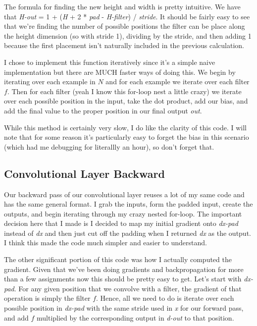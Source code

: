 \documentclass[12pt]{article}
\begin{document}
The formula for finding the new height and width is pretty intuitive. We have that 
\emph{H-out} = 1 + (\emph{H} + 2 * \emph{pad} - \emph{H-filter}) / \emph{stride}. It should 
be fairly easy to see that we're finding the number of possible positions the filter can
be place along the height dimension (so with stride 1), dividing by the stride, and then 
adding 1 because the first placement isn't naturally included in the previous calculation.

I chose to implement this function iteratively since it's a simple naive implementation but there are 
MUCH faster ways of doing this. We begin by iterating over each example in $N$ and for each 
example we iterate over each filter $f$. Then for each filter (yeah I know this for-loop nest 
a little crazy) we iterate over each possible position in the input, take the dot product, add 
our bias, and add the final value to the proper position in our final output \emph{out}. 

While this method is certainly very slow, I do like the clarity of this code. I will note that
for some reason it's particularly easy to forget the bias in this scenario (which had me 
debugging for literallly an hour), so don't forget that. 

\subsection{Convolutional Layer Backward}
Our backward pass of our convolutional layer reuses a lot of my same code and has the same general
format. I grab the inputs, form the padded input, create the outputs, and begin iterating through 
my crazy nested for-loop. The important decision here that I made is I decided to map my 
initial gradient onto \emph{dx-pad} instead of \emph{dx} and then just cut off the padding 
when I returned \emph{dx} as the output. I think this made the code much simpler and easier to 
understand. 

The other significant portion of this code was how I actually computed the gradient. Given that we've 
been doing gradients and backpropagation for more than a few assignments now this should be 
pretty easy to get. Let's start with \emph{dx-pad}. For any given position that we convolve with 
a filter, the gradient of that operation is simply the filter $f$. Hence, all we need to do 
is iterate over each possible position in \emph{dx-pad} with the same stride used in \emph{x} for 
our forward pass, and add $f$ multiplied by the corresponding output in \emph{d-out} to that position. 
\end{document}
